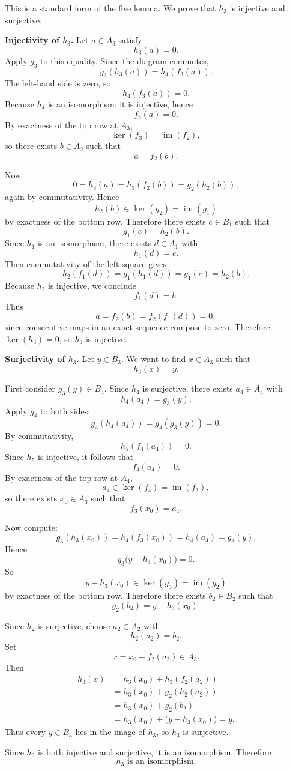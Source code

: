 \begin{solution}This is a standard form of the five lemma. We prove that \(h_3\) is injective and surjective.

\par

\textbf{Injectivity of \(h_3\).}
Let \(a\in A_3\) satisfy
\[
h_3(a)=0.
\]
Apply \(g_3\) to this equality. Since the diagram commutes,
\[
g_3(h_3(a))=h_4(f_3(a)).
\]
The left-hand side is zero, so
\[
h_4(f_3(a))=0.
\]
Because \(h_4\) is an isomorphism, it is injective, hence
\[
f_3(a)=0.
\]
By exactness of the top row at \(A_3\),
\[
\ker(f_3)=\operatorname{im}(f_2),
\]
so there exists \(b\in A_2\) such that
\[
a=f_2(b).
\]

Now
\[
0=h_3(a)=h_3(f_2(b))=g_2(h_2(b)),
\]
again by commutativity. Hence
\[
h_2(b)\in \ker(g_2)=\operatorname{im}(g_1)
\]
by exactness of the bottom row. Therefore there exists \(c\in B_1\) such that
\[
g_1(c)=h_2(b).
\]
Since \(h_1\) is an isomorphism, there exists \(d\in A_1\) with
\[
h_1(d)=c.
\]
Then commutativity of the left square gives
\[
h_2(f_1(d))=g_1(h_1(d))=g_1(c)=h_2(b).
\]
Because \(h_2\) is injective, we conclude
\[
f_1(d)=b.
\]
Thus
\[
a=f_2(b)=f_2(f_1(d))=0,
\]
since consecutive maps in an exact sequence compose to zero. Therefore \(\ker(h_3)=0\), so \(h_3\) is injective.

\par

\textbf{Surjectivity of \(h_3\).}
Let \(y\in B_3\). We want to find \(x\in A_3\) such that
\[
h_3(x)=y.
\]

First consider \(g_3(y)\in B_4\). Since \(h_4\) is surjective, there exists \(a_4\in A_4\) with
\[
h_4(a_4)=g_3(y).
\]
Apply \(g_4\) to both sides:
\[
g_4(h_4(a_4))=g_4(g_3(y))=0.
\]
By commutativity,
\[
h_5(f_4(a_4))=0.
\]
Since \(h_5\) is injective, it follows that
\[
f_4(a_4)=0.
\]
By exactness of the top row at \(A_4\),
\[
a_4\in \ker(f_4)=\operatorname{im}(f_3),
\]
so there exists \(x_0\in A_3\) such that
\[
f_3(x_0)=a_4.
\]

Now compute:
\[
g_3(h_3(x_0))=h_4(f_3(x_0))=h_4(a_4)=g_3(y).
\]
Hence
\[
g_3\bigl(y-h_3(x_0)\bigr)=0.
\]
So
\[
y-h_3(x_0)\in \ker(g_3)=\operatorname{im}(g_2)
\]
by exactness of the bottom row. Therefore there exists \(b_2\in B_2\) such that
\[
g_2(b_2)=y-h_3(x_0).
\]

Since \(h_2\) is surjective, choose \(a_2\in A_2\) with
\[
h_2(a_2)=b_2.
\]
Set
\[
x=x_0+f_2(a_2)\in A_3.
\]
Then
\[
\begin{aligned}
h_3(x)
&=h_3(x_0)+h_3(f_2(a_2))\\
&=h_3(x_0)+g_2(h_2(a_2))\\
&=h_3(x_0)+g_2(b_2)\\
&=h_3(x_0)+\bigl(y-h_3(x_0)\bigr)=y.
\end{aligned}
\]
Thus every \(y\in B_3\) lies in the image of \(h_3\), so \(h_3\) is surjective.

\par

Since \(h_3\) is both injective and surjective, it is an isomorphism. Therefore
\[
\boxed{h_3 \text{ is an isomorphism}.}
\]
\end{solution}

